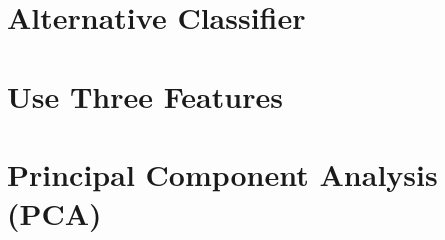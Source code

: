\documentclass[11pt]{article}
\begin{document}
\section{Alternative Classifier}

\section{Use Three Features}

\section{Principal Component Analysis (PCA)}
\end{document}
